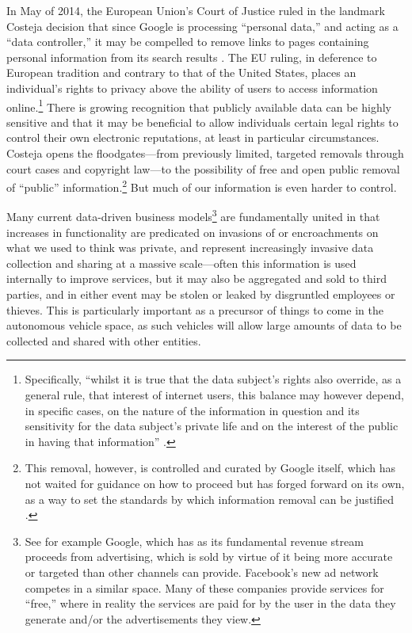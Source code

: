  In May of 2014, the European
Union's Court of Justice 
ruled in the landmark Costeja decision that since Google is processing
``personal data,'' and acting as a ``data controller,'' it may be
compelled to remove links to pages containing personal information
from its search results \cite{ICO}. The EU ruling, in deference to European
tradition and contrary to that of the United States, places an
individual's rights to privacy above the ability of users to access
information online.\footnote{Specifically, ``whilst it is true that the
data subject’s rights also override, as a general rule, that interest
of internet users, this balance may however depend, in specific cases,
on the nature of the information in question and its sensitivity for
the data subject’s private life and on the interest of the public in
having that information'' \cite{COJCosteja}.} There is growing recognition that publicly
available data can be highly sensitive and that it may be beneficial
to allow individuals certain legal rights to control their own
electronic reputations, at least in particular circumstances. Costeja
opens the floodgates---from previously limited, targeted removals
through court cases and copyright law---to the possibility of free and
open public removal of ``public'' information.\footnote{This removal,
  however, is controlled and curated by Google itself, which has not
  waited for guidance on how to proceed but has forged forward on its
  own, as a way to set the standards by which information removal can
  be justified \cite{powlesChaparro}.} But much of our
information is even harder to control.

Many current data-driven business models\footnote{See for example
  Google, which has as its fundamental revenue stream proceeds from
  advertising, which is sold by virtue of it being more accurate or
  targeted than other channels can provide. Facebook's new ad network
  competes in a similar space. Many of these companies provide
  services for ``free,'' where in reality the services are paid for by
the user in the data they generate and/or the advertisements they
view.} are fundamentally united in that increases in
functionality are predicated on invasions of or encroachments on what
we used to think was private, and represent increasingly invasive data
collection and sharing at a massive scale---often this information is
used internally to improve services, but it may also be aggregated and
sold to third parties, and in either event may be stolen or leaked by
disgruntled employees or thieves. This
is particularly important as a precursor of things to
come in the autonomous vehicle space, as such vehicles will allow
large amounts of data to be collected and shared with other entities. 


